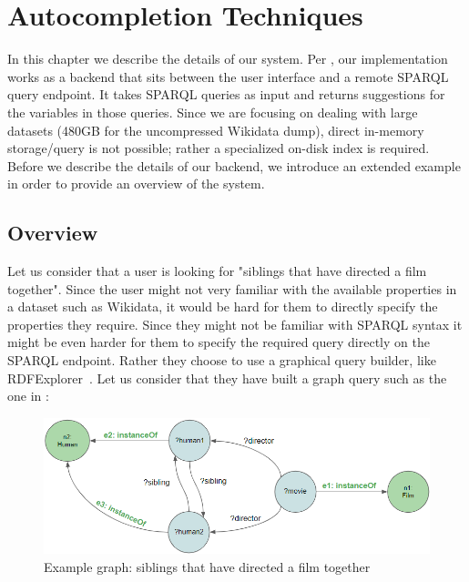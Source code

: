 \chapter{Autocompletion Techniques}
\label{chap:Backend}

In this chapter we describe the details of our system. Per , our implementation works as a backend that sits between the user interface and a remote SPARQL query endpoint. It takes SPARQL queries as input and returns suggestions for the variables in those queries. Since we are focusing on dealing with large datasets (480GB for the uncompressed Wikidata dump), direct in-memory storage/query is not possible; rather a specialized on-disk index is required.  Before we describe the details of our backend, we introduce an extended example in order to provide an overview of the system.

\section{Overview}

Let us consider that a user is looking for "siblings that have directed a film together". 
Since the user might not very familiar with the available properties in a dataset such as Wikidata, it would be hard for them to directly specify the properties they require. Since they might not be familiar with SPARQL syntax it might be even harder for them to specify the required query directly on the SPARQL endpoint. Rather they choose to use a graphical query builder, like RDFExplorer~\cite{Vargas2019}. Let us consider that they have built a graph query such as the one in :

\begin{figure}[H]
    \centering
        \includegraphics[width=\linewidth]{imagenes/SiblingsGraph.png}
        \caption{Example graph: siblings that have directed a film together}
        \label{fig:siblingsQueryGraph}
\end{figure}

